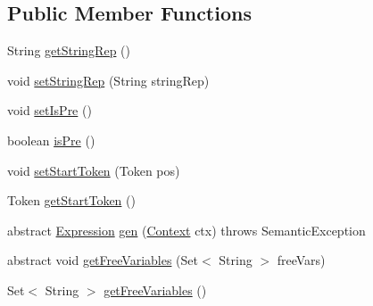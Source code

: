 \subsection*{Public Member Functions}
\begin{DoxyCompactItemize}
\item 
String \hyperlink{classorg_1_1tzi_1_1use_1_1parser_1_1ocl_1_1_a_s_t_expression_a6f8542500c4836f68a3bc2c737ea9515}{get\-String\-Rep} ()
\item 
void \hyperlink{classorg_1_1tzi_1_1use_1_1parser_1_1ocl_1_1_a_s_t_expression_a9a81b7753c3171ada2030e3cca31c36d}{set\-String\-Rep} (String string\-Rep)
\item 
void \hyperlink{classorg_1_1tzi_1_1use_1_1parser_1_1ocl_1_1_a_s_t_expression_acc7bab8748113d4465fb2c896cd043d3}{set\-Is\-Pre} ()
\item 
boolean \hyperlink{classorg_1_1tzi_1_1use_1_1parser_1_1ocl_1_1_a_s_t_expression_a11eeddd378e947e6062319db7ff2b71c}{is\-Pre} ()
\item 
void \hyperlink{classorg_1_1tzi_1_1use_1_1parser_1_1ocl_1_1_a_s_t_expression_a9f37c6dd0c525848dcb8e34c2ce63054}{set\-Start\-Token} (Token pos)
\item 
Token \hyperlink{classorg_1_1tzi_1_1use_1_1parser_1_1ocl_1_1_a_s_t_expression_a9e30d89695891d64ea309856134781e3}{get\-Start\-Token} ()
\item 
abstract \hyperlink{classorg_1_1tzi_1_1use_1_1uml_1_1ocl_1_1expr_1_1_expression}{Expression} \hyperlink{classorg_1_1tzi_1_1use_1_1parser_1_1ocl_1_1_a_s_t_expression_a2867c2dce65ba7cc2b12f9fbe0f02f64}{gen} (\hyperlink{classorg_1_1tzi_1_1use_1_1parser_1_1_context}{Context} ctx)  throws Semantic\-Exception
\item 
abstract void \hyperlink{classorg_1_1tzi_1_1use_1_1parser_1_1ocl_1_1_a_s_t_expression_a741c9ab827921dbd69ed4846a403b76a}{get\-Free\-Variables} (Set$<$ String $>$ free\-Vars)
\item 
Set$<$ String $>$ \hyperlink{classorg_1_1tzi_1_1use_1_1parser_1_1ocl_1_1_a_s_t_expression_a202e8a0eee4f9937506667b4d437e424}{get\-Free\-Variables} ()
\end{DoxyCompactItemize}
